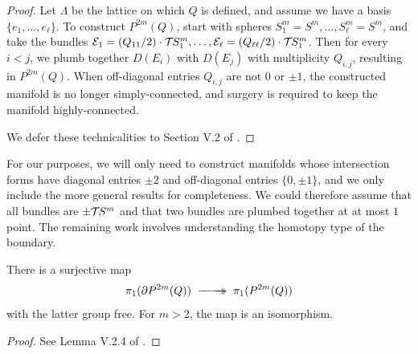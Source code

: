 \begin{proof}
Let $\Lambda$ be the lattice on which $Q$ is defined, and assume we have a basis $\{e_1,\ldots, e_\ell\}$. To construct $P^{2m}(Q)$, start with spheres $S_1^m=S^m,\ldots, S_\ell^m=S^m$, and take the bundles $\mathcal{E}_1=(Q_{11}/2)\cdot {\mathcal{T}\hspace{-0.1em}} S^m_1,\ldots, \mathcal{E}_\ell=(Q_{\ell\ell}/2)\cdot {\mathcal{T}\hspace{-0.1em}} S^m_1$. Then for every $i<j$, we plumb together $D(E_i)$ with $D(E_j)$ with multiplicity $Q_{i,j}$, resulting in $P^{2m}(Q)$. When off-diagonal entries $Q_{i,j}$ are not $0$ or $\pm 1$, the constructed manifold is no longer simply-connected, and surgery is required to keep the manifold highly-connected. 

We defer these technicalities to Section V.2 of \cite{browder1972surgery}.
\end{proof}

For our purposes, we will only need to construct manifolds whose intersection forms have diagonal entries $\pm 2$ and off-diagonal entries $\{0,\pm 1\}$, and we only include the more general results for completeness. We could therefore assume that all bundles are $\pm {\mathcal{T}\hspace{-0.1em}} S^m$ and that two bundles are plumbed together at at most $1$ point.
%
%
The remaining work involves understanding the homotopy type of the boundary. 

\begin{proposition}\label{prop:fundamental-group-plumbing}
	There is a surjective map
	\[\pi_1(\partial P^{2m}(Q))\lkxsurj \pi_1(P^{2m}(Q))\]
	with the latter group free. For $m>2$, the map is an isomorphism.
\end{proposition}
\begin{proof}
	See Lemma V.2.4 of \cite{browder1972surgery}.
\end{proof}

